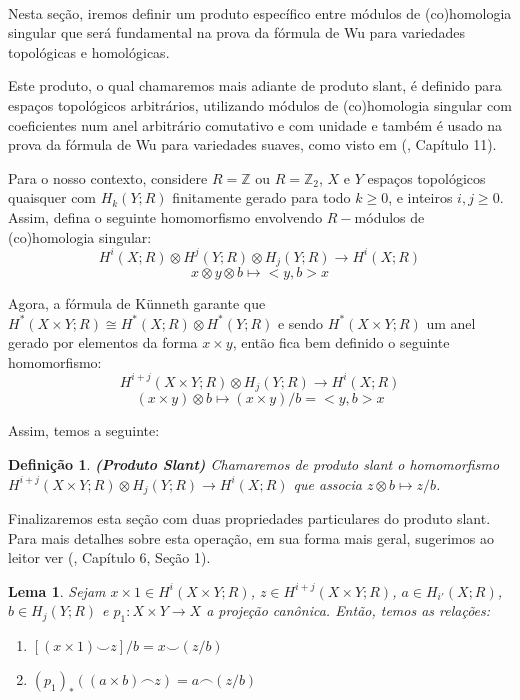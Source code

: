 \documentclass[12pt,oneside]{book} %
\newtheorem{defi}   {\hspace{0.5cm}Defini\c c\~ao}[chapter]
\newtheorem{lem}    {\hspace{0.5cm}Lema}[chapter]
\newcommand{\Z}{\mathbb{Z}}
\newcommand{\ccup}{\smile}
\newcommand{\ccap}{\frown}
\newcommand{\tensor}{\otimes}
\begin{document}
\

\par Nesta seção, iremos definir um produto específico entre módulos de (co)homologia singular que será fundamental na prova da fórmula de Wu para variedades topológicas e homológicas.

\par Este produto, o qual chamaremos mais adiante de produto slant, é definido para espaços topológicos arbitrários, utilizando módulos de (co)homologia singular com coeficientes num anel arbitrário comutativo e com unidade e também é usado na prova da fórmula de Wu para variedades suaves, como visto em (\cite{milnor_1}, Capítulo 11).

\par Para o nosso contexto, considere $R=\Z$ ou $R=\Z_{2}$, $X$ e $Y$ espaços topológicos quaisquer com $H_{k}(Y;R)$ finitamente gerado para todo $k\geq 0$, e inteiros $i,j\geq 0$. Assim, defina o seguinte homomorfismo envolvendo $R-$módulos de (co)homologia singular:
$$ H^{i}(X;R)\tensor H^{j}(Y;R)\tensor H_{j}(Y;R)\to H^{i}(X;R) $$
$$ x\tensor y\tensor b\mapsto <y,b>x $$

\par Agora, a fórmula de Künneth garante que $H^{*}(X\times Y;R)\cong H^{*}(X;R)\tensor H^{*}(Y;R)$ e sendo $H^{*}(X\times Y;R)$ um anel gerado por elementos da forma $x\times y$, então fica bem definido o seguinte homomorfismo:
$$ H^{i+j}(X\times Y;R)\tensor H_{j}(Y;R)\to H^{i}(X;R) $$
$$ (x\times y)\tensor b\mapsto (x\times y)/b=<y,b>x $$

\par Assim, temos a seguinte:

\begin{defi}{\bf (Produto Slant)}
	Chamaremos de produto slant o homomorfismo $H^{i+j}(X\times Y;R)\tensor H_{j}(Y;R)\to H^{i}(X;R)$ que associa $z\tensor b\mapsto z/b$.
\end{defi}

\par Finalizaremos esta seção com duas propriedades particulares do produto slant. Para mais detalhes sobre esta operação, em sua forma mais geral, sugerimos ao leitor ver (\cite{spanier}, Capítulo 6, Seção 1).

\begin{lem}\label{lema_slant}
	Sejam $x\times 1\in H^{i}(X\times Y;R)$, $z\in H^{i+j}(X\times Y;R)$, $a\in H_{i'}(X;R)$, $b\in H_{j}(Y;R)$ e $p_{1}:X\times Y\to X$ a projeção canônica. Então, temos as relações:
	
	\begin{enumerate}
		\item $[(x\times 1)\ccup z]/b=x\ccup(z /b)$
		\item $(p_{1})_{*}((a\times b)\ccap z)=a\ccap (z/b)$
	\end{enumerate}
\end{lem}
\end{document}
